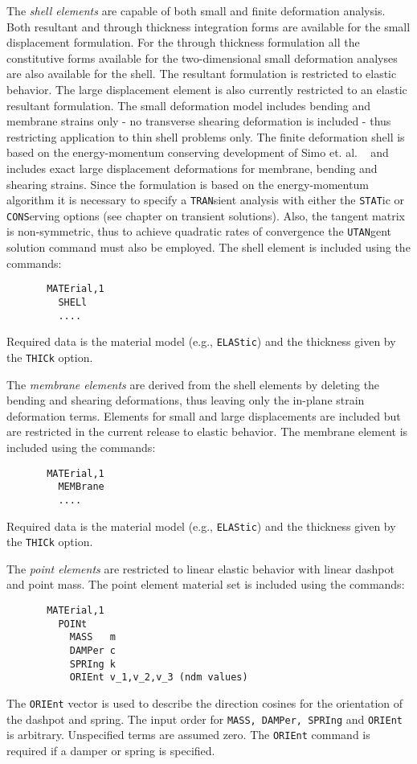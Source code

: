 The {\it shell elements} are capable of both small and finite deformation
analysis. 
Both resultant and through thickness integration forms are available for the
small displacement formulation.  For the through thickness formulation
all the constitutive forms available for the two-dimensional small
deformation analyses are also available for the shell.
The resultant formulation is restricted to elastic behavior.
The large displacement element is also currently
restricted to an elastic resultant formulation.
The small deformation model includes bending and membrane strains only -
no transverse shearing deformation is included - thus restricting application
to thin shell problems only.  The finite deformation shell is based on the
energy-momentum conserving development of Simo et. al. ~\cite{simosh92}
and includes exact
large displacement deformations for membrane, bending and shearing strains.
Since the formulation is based on the energy-momentum algorithm it is
necessary to specify a \texttt{TRAN}sient analysis with either the \texttt{STAT}ic
or \texttt{CONS}erving options (see chapter on transient solutions).  Also,
the tangent matrix is non-symmetric, thus to achieve quadratic rates of
convergence the \texttt{UTAN}gent solution command must also be employed.
The shell element is included using the commands:
\begin{verbatim}
       MATErial,1
         SHELl
		 ....
\end{verbatim}
Required data is the material model (e.g., \texttt{ELAStic}) and the thickness
given by the \texttt{THICk} option.

The {\it membrane elements} are derived from the shell elements by deleting
the bending and shearing deformations, thus leaving only the in-plane
strain deformation terms.  Elements for small and large displacements
are included but are restricted in the current release to elastic behavior.
The membrane element is included using the commands:
\begin{verbatim}
       MATErial,1
         MEMBrane
		 ....
\end{verbatim}
Required data is the material model (e.g., \texttt{ELAStic}) and the thickness
given by the \texttt{THICk} option.

The {\it point elements} are restricted to linear elastic behavior with
linear dashpot and point mass.
The point element material set is included using the commands:
\begin{verbatim}
       MATErial,1
         POINt
           MASS   m
           DAMPer c
           SPRIng k
           ORIEnt v_1,v_2,v_3 (ndm values)
\end{verbatim}
The \texttt{ORIEnt} vector is used to describe the direction cosines for the
orientation of the dashpot and spring.  The input order for \texttt{MASS, DAMPer,
SPRIng} and \texttt{ORIEnt} is arbitrary.  Unspecified terms are assumed zero.
The \texttt{ORIEnt} command is required if a damper or spring is specified.

